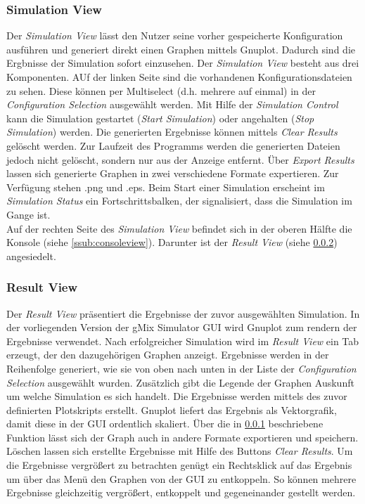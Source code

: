 \documentclass[a4paper, 11pt]{article} %
\begin{document}
\subsubsection{Simulation View} %
\label{ssub:simulationview}
Der \emph{Simulation View} lässt den Nutzer seine vorher gespeicherte Konfiguration ausführen und generiert direkt einen Graphen mittels Gnuplot. Dadurch sind die Ergbnisse der Simulation sofort einzusehen. Der \emph{Simulation View} besteht aus drei Komponenten. AUf der linken Seite sind die vorhandenen Konfigurationsdateien zu sehen. Diese können per Multiselect (d.h. mehrere auf einmal) in der \emph{Configuration Selection} ausgewählt werden. Mit Hilfe der \emph{Simulation Control} kann die Simulation gestartet (\emph{Start Simulation}) oder angehalten (\emph{Stop Simulation}) werden. Die generierten Ergebnisse können mittels \emph{Clear Results} gelöscht werden. Zur Laufzeit des Programms werden die generierten Dateien jedoch nicht gelöscht, sondern nur aus der Anzeige entfernt. Über \emph{Export Results} lassen sich generierte Graphen in zwei verschiedene Formate expertieren. Zur Verfügung stehen .png und .eps. Beim Start einer Simulation erscheint im \emph{Simulation Status} ein Fortschrittsbalken, der signalisiert, dass die Simulation im Gange ist. \\
Auf der rechten Seite des \emph{Simulation View} befindet sich in der oberen Hälfte die Konsole (siehe \ref{ssub:consoleview}). Darunter ist der \emph{Result View} (siehe \ref{ssub:resultview}) angesiedelt.

\subsubsection{Result View} %
\label{ssub:resultview}
Der \emph{Result View} präsentiert die Ergebnisse der zuvor ausgewählten Simulation. In der vorliegenden Version der gMix Simulator GUI wird Gnuplot zum rendern der Ergebnisse verwendet. Nach erfolgreicher Simulation wird im \emph{Result View} ein Tab erzeugt, der den dazugehörigen Graphen anzeigt. Ergebnisse werden in der Reihenfolge generiert, wie sie von oben nach unten in der Liste der \emph{Configuration Selection} ausgewählt wurden. Zusätzlich gibt die Legende der Graphen Auskunft um welche Simulation es sich handelt. Die Ergebnisse werden mittels des zuvor definierten Plotskripts erstellt. Gnuplot liefert das Ergebnis als Vektorgrafik, damit diese in der GUI ordentlich skaliert. Über die in \ref{ssub:simulationview} beschriebene Funktion lässt sich der Graph auch in andere Formate exportieren und speichern. Löschen lassen sich erstellte Ergebnisse mit Hilfe des Buttons \emph{Clear Results}. Um die Ergebnisse vergrößert zu betrachten genügt ein Rechtsklick auf das Ergebnis um über das Menü den Graphen von der GUI zu entkoppeln. So können mehrere Ergebnisse gleichzeitig vergrößert, entkoppelt und gegeneinander gestellt werden. 
\end{document}
